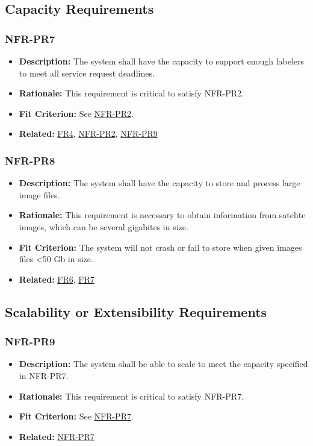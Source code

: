 \documentclass[12pt]{article}
\begin{document}
\subsection{Capacity Requirements}
\subsubsection*{NFR-PR7}
\label{sec:PR7}
\begin{itemize}
  \item \textbf{Description:} The system shall have the capacity to support enough labelers to meet all service request deadlines.
  \item \textbf{Rationale:} This requirement is critical to satisfy NFR-PR2.
  \item \textbf{Fit Criterion:} See \hyperref[sec:PR2]{NFR-PR2}.
  \item \textbf{Related:} \hyperref[sec:FR4]{FR4},  \hyperref[sec:PR2]{NFR-PR2},  \hyperref[sec:PR9]{NFR-PR9}
\end{itemize}
\subsubsection*{NFR-PR8}
\label{sec:PR8}
\begin{itemize}
  \item \textbf{Description:} The system shall have the capacity to store and process large image files.
  \item \textbf{Rationale:} This requirement is necessary to obtain information from satelite images, which can be several gigabites in size.
  \item \textbf{Fit Criterion:} The system will not crash or fail to store when given images files <50 Gb in size.
  \item \textbf{Related:} \hyperref[sec:FR6]{FR6}, \hyperref[sec:FR7]{FR7}
\end{itemize}
\subsection{Scalability or Extensibility Requirements}
\subsubsection*{NFR-PR9}
\label{sec:PR9}
\begin{itemize}
  \item \textbf{Description:} The system shall be able to scale to meet the capacity specified in NFR-PR7.
  \item \textbf{Rationale:} This requirement is critical to satisfy NFR-PR7.
  \item \textbf{Fit Criterion:} See \hyperref[sec:PR7]{NFR-PR7}.
   \item \textbf{Related:} \hyperref[sec:PR7]{NFR-PR7}
\end{itemize}
\end{document}
